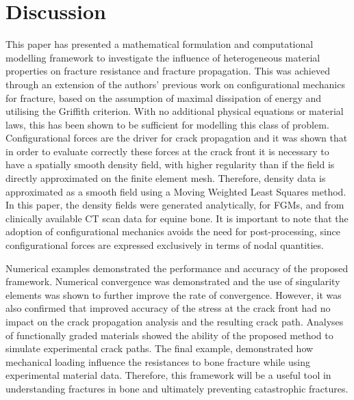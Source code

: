\documentclass[onecolumn]{svjour3}
\begin{document}
% 
\section{Discussion}\label{sec:discussion}
This paper has presented a mathematical formulation and computational modelling framework to investigate the 
influence of heterogeneous material properties on fracture resistance and fracture propagation. 
This was achieved through an extension of the authors' previous work on configurational mechanics for fracture, based on the assumption of maximal dissipation of energy and utilising the Griffith criterion. With no additional physical equations or material laws, this has been shown to be sufficient for modelling this class of problem.
Configurational forces are the driver for crack propagation and it was shown that in order to evaluate correctly these forces at the crack front it is necessary to have a spatially smooth density field, with higher regularity than if the field is directly approximated on the finite element mesh. 
Therefore, density data is approximated as a smooth field using a Moving Weighted Least Squares method. 
In this paper, the density fields were generated analytically, for FGMs, and from clinically available CT scan data for equine bone.
It is important to note that the adoption of configurational mechanics avoids the need for post-processing, since configurational forces are expressed exclusively in terms of nodal quantities.


Numerical examples demonstrated the performance and accuracy of the proposed framework. 
Numerical convergence was demonstrated and the use of singularity elements was shown to further improve the rate of convergence. 
However, it was also confirmed that improved accuracy of the stress at the crack front had no impact on the crack propagation analysis and the resulting crack path. 
Analyses of functionally graded materials showed the ability of the proposed method to simulate experimental crack paths. 
The final example, demonstrated how mechanical loading influence the resistances to bone fracture while using experimental material data. 
Therefore, this framework will be a useful tool in understanding fractures in bone and ultimately preventing catastrophic fractures. 
\end{document}

